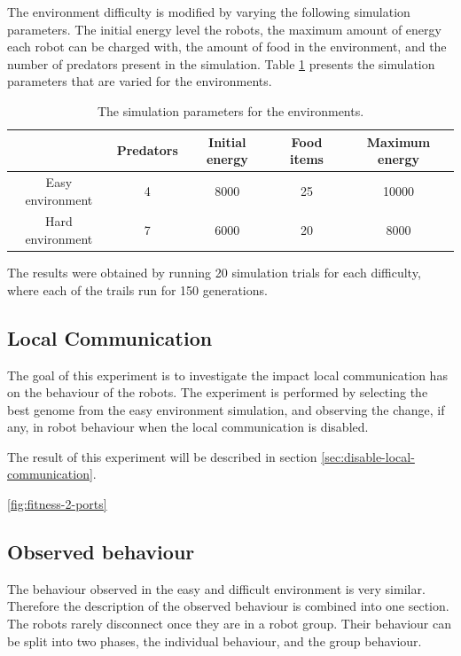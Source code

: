 The environment difficulty is modified by varying the following simulation parameters.
The initial energy level the robots, the maximum amount of energy each robot can be charged with, the amount of food in the environment, and the number of predators present in the simulation.
Table \ref{tab:environment-difficulty} presents the simulation parameters that are varied for the environments.

\begin{table}[H]
	\centering
	\label{tab:environment-difficulty}
	\begin{tabular}{|c|c|c|c|c|}
		\hline  & Predators & Initial energy & Food items & Maximum energy \\ 
		\hline Easy environment & 4 & 8000 & 25 & 10000 \\ 
		\hline Hard environment & 7 & 6000 & 20 &8000 \\ 
		\hline 
		
	\end{tabular} 
	\caption{The simulation parameters for the environments.}
\end{table}

The results were obtained by running 20 simulation trials for each difficulty, where each of the trails run for 150 generations.

\newpage
\pagestyle{plain}



\newpage
\pagestyle{main}

\subsection{Local Communication}
\label{sec:local_communication}
The goal of this experiment is to investigate the impact local communication has on the behaviour of the robots.
The experiment is performed by selecting the best genome from the easy environment simulation, and observing the change, if any, in robot behaviour when the local communication is disabled.

The result of this experiment will be described in section \ref{sec:disable-local-communication}.

\ref{fig:fitness-2-ports}
\subsection{Observed behaviour}
\label{sec:observed-behaviour}
The behaviour observed in the easy and difficult environment is very similar.
Therefore the description of the observed behaviour is combined into one section.
The robots rarely disconnect once they are in a robot group.
Their behaviour can be split into two phases, the individual behaviour, and the group behaviour.

